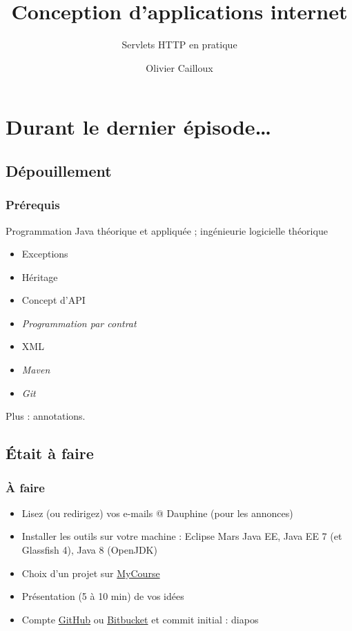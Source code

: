 \documentclass[english, french]{beamer}
\title{Conception d’applications internet}
\subtitle{Servlets HTTP en pratique}
\author{Olivier Cailloux}
\institute[LAMSADE]{LAMSADE, Université Paris-Dauphine}
\date{\formatdate{7}{12}{2015}}
\begin{document}


\begin{frame}[plain]
   \titlepage
\end{frame}
\addtocounter{framenumber}{-1}

\section[Dernier épisode]{Durant le dernier épisode…}
\subsection{Dépouillement}
\begin{frame}
	\frametitle{Prérequis}
	Programmation Java théorique et appliquée ; ingénieurie logicielle théorique
	\begin{itemize}
		\item Exceptions
		\item Héritage
		\item Concept d’API
		\item \emph{Programmation par contrat}
		\item XML
		\item \emph{Maven}
		\item \emph{Git}
	\end{itemize}
	Plus : annotations.
\end{frame}

\subsection{Était à faire}
\begin{frame}
	\frametitle{À faire}
	\begin{itemize}
		\item Lisez (ou redirigez) vos e-mails @ Dauphine (pour les annonces)
		\item Installer les outils sur votre machine : Eclipse Mars Java EE, Java EE 7 (et Glassfish 4), Java 8 (OpenJDK)
		\item Choix d’un projet sur \href{https://mycourse.dauphine.fr/webapps/blackboard/execute/courseMain?course_id=_34753_1}{MyCourse}
		\item Présentation (5 à 10 min) de vos idées
		\item Compte \href{https://github.com/}{GitHub} ou \href{https://bitbucket.org/}{Bitbucket} et commit initial : diapos
	\end{itemize}
\end{frame}
\end{document}
